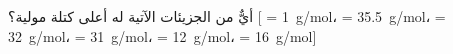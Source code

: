 \begin{question}\begin{instance}    \begin{mcq}[standalone=true]      \begin{stem}        أيٌّ من الجزيئات الآتية له أعلى كتلة مولية؟ [ = 1\ \textrm{g}/\textrm{mol}،  = 35.5\ \textrm{g}/\textrm{mol}، = 32\ \textrm{g}/\textrm{mol}،  = 31\ \textrm{g}/\textrm{mol}،  = 12\ \textrm{g}/\textrm{mol}،  = 16\ \textrm{g}/\textrm{mol}]\par      \end{stem}      \begin{distractors}\end{distractors}                            \end{mcq}  \end{instance}\end{question}